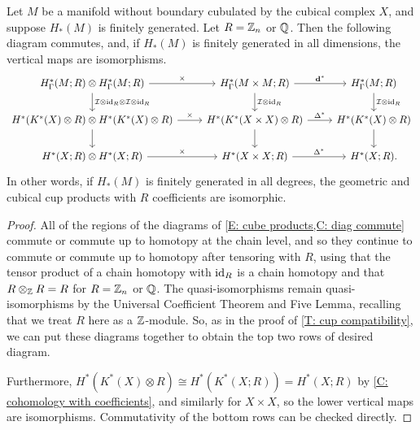 \begin{theorem}
	Let $M$ be a manifold without boundary cubulated by the cubical complex $X$, and suppose $H_*(M)$ is finitely generated.
	Let $R = \mathbb{Z}_n$ or $\mathbb{Q}$.
	Then the following diagram commutes, and, if $H_*(M)$ is finitely generated in all dimensions, the vertical maps are isomorphisms.
	\[
	\begin{tikzcd}
	H^*_\Gamma(M;R) \otimes H^*_\Gamma(M;R) \arrow[r,"\times"]\arrow[d,"\mc I \otimes \id_R \otimes \mc I \otimes \id_R"]& H^*_\Gamma(M \times M;R) \arrow[d,"\mc I\otimes \id_R"]\arrow[r,"\diag^*"] & H^*_\Gamma(M;R) \arrow[d,"\mc I \otimes \id_R"]\\
	H^*(K^*(X)\otimes R) \otimes H^*(K^*(X)\otimes R) \arrow[d] \arrow[r,"\times"]& H^*(K^*(X \times X)\otimes R) \arrow[r,"\Delta^*"]\arrow[d]  & H^*(K^*(X)\otimes R)\arrow[d] \\
	H^*(X; R) \otimes H^*(X; R) \arrow[r,"\times"]& H^*(X \times X;R) \arrow[r,"\Delta^*"] & H^*(X;R).
	\end{tikzcd}
	\]
	In other words, if $H_*(M)$ is finitely generated in all degrees, the geometric and cubical cup products with $R$ coefficients are isomorphic.
\end{theorem}
\begin{proof}
	All of the regions of the diagrams of \cref{E: cube products,C: diag commute} commute or commute up to homotopy at the chain level, and so they continue to commute or commute up to homotopy after tensoring with $R$, using that the tensor product of a chain homotopy with $\mathrm{id}_R$ is a chain homotopy and that $R \otimes_{\mathbb{Z}} R = R$ for $R = \mathbb{Z}_n$ or $\mathbb{Q}$.
	The quasi-isomorphisms remain quasi-isomorphisms by the Universal Coefficient Theorem and Five Lemma, recalling that we treat $R$ here as a $\mathbb{Z}$-module.
	So, as in the proof of \cref{T: cup compatibility}, we can put these diagrams together to obtain the top two rows of desired diagram.

	Furthermore, $H^*(K^*(X)\otimes R) \cong H^*(K^*(X;R))=H^*(X;R)$ by \cref{C: cohomology with coefficients}, and similarly for $X \times X$, so the lower vertical maps are isomorphisms.
	Commutativity of the bottom rows can be checked directly.
\end{proof}


